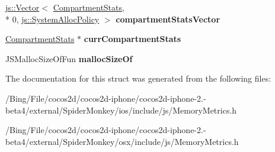 \begin{DoxyCompactItemize}
\item 
\hypertarget{struct_j_s_1_1_runtime_stats_a83d30a8da2232aa964f712270d591d87}{\hyperlink{classjs_1_1_vector}{js\-::\-Vector}$<$ \hyperlink{struct_j_s_1_1_compartment_stats}{Compartment\-Stats}, \\*
0, \hyperlink{classjs_1_1_system_alloc_policy}{js\-::\-System\-Alloc\-Policy} $>$ {\bfseries compartment\-Stats\-Vector}}\label{struct_j_s_1_1_runtime_stats_a83d30a8da2232aa964f712270d591d87}

\item 
\hypertarget{struct_j_s_1_1_runtime_stats_aae744c8df9a87970cea754995e309b77}{\hyperlink{struct_j_s_1_1_compartment_stats}{Compartment\-Stats} $\ast$ {\bfseries curr\-Compartment\-Stats}}\label{struct_j_s_1_1_runtime_stats_aae744c8df9a87970cea754995e309b77}

\item 
\hypertarget{struct_j_s_1_1_runtime_stats_a1db3ee8b9f7198350f3ab915f69a82c8}{J\-S\-Malloc\-Size\-Of\-Fun {\bfseries malloc\-Size\-Of}}\label{struct_j_s_1_1_runtime_stats_a1db3ee8b9f7198350f3ab915f69a82c8}

\end{DoxyCompactItemize}


The documentation for this struct was generated from the following files\-:\begin{DoxyCompactItemize}
\item 
/\-Bing/\-File/cocos2d/cocos2d-\/iphone/cocos2d-\/iphone-\/2.-\/beta4/external/\-Spider\-Monkey/ios/include/js/Memory\-Metrics.\-h\item 
/\-Bing/\-File/cocos2d/cocos2d-\/iphone/cocos2d-\/iphone-\/2.-\/beta4/external/\-Spider\-Monkey/osx/include/js/Memory\-Metrics.\-h\end{DoxyCompactItemize}
